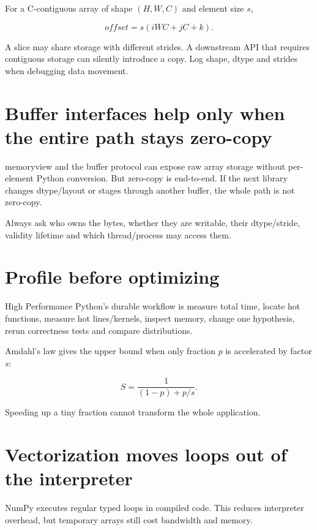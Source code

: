 For a C-contiguous array of shape \((H,W,C)\) and element size \(s\),

\[
offset=s(iWC+jC+k).
\]

A slice may share storage with different strides. A downstream API that requires contiguous storage can silently introduce a copy. Log shape, dtype and strides when debugging data movement.

\section{Buffer interfaces help only when the entire path stays zero-copy}\label{01-foundations-i-ch017-buffer-interfaces-help-only-when-the-entire-path-stays-zero-copy}

memoryview and the buffer protocol can expose raw array storage without per-element Python conversion. But zero-copy is end-to-end. If the next library changes dtype/layout or stages through another buffer, the whole path is not zero-copy.

Always ask who owns the bytes, whether they are writable, their dtype/stride, validity lifetime and which thread/process may access them.

\section{Profile before optimizing}\label{01-foundations-i-ch017-profile-before-optimizing}

High Performance Python's durable workflow is measure total time, locate hot functions, measure hot lines/kernels, inspect memory, change one hypothesis, rerun correctness tests and compare distributions.

Amdahl's law gives the upper bound when only fraction \(p\) is accelerated by factor \(s\):

\[
S=\frac{1}{(1-p)+p/s}.
\]

Speeding up a tiny fraction cannot transform the whole application.

\section{Vectorization moves loops out of the interpreter}\label{01-foundations-i-ch017-vectorization-moves-loops-out-of-the-interpreter}

NumPy executes regular typed loops in compiled code. This reduces interpreter overhead, but temporary arrays still cost bandwidth and memory.

